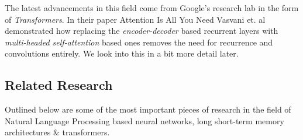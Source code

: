 \documentclass[11pt]{article}
\begin{document}
	The latest advancements in this field come from Google's research lab in the form of \textit{Transformers}. In their paper Attention Is All You Need\citep{atayl} Vasvani et. al demonstrated how replacing the \textit{encoder-decoder} based recurrent layers with \textit{multi-headed self-attention} based ones removes the need for recurrence and convolutions entirely. We look into this in a bit more detail later.\\
	
	
		
	\subsection{Related Research}\label{rr}
	Outlined below are some of the most important pieces of research in the field of Natural Language Processing based neural networks, long short-term memory architectures \& transformers.
\end{document}
